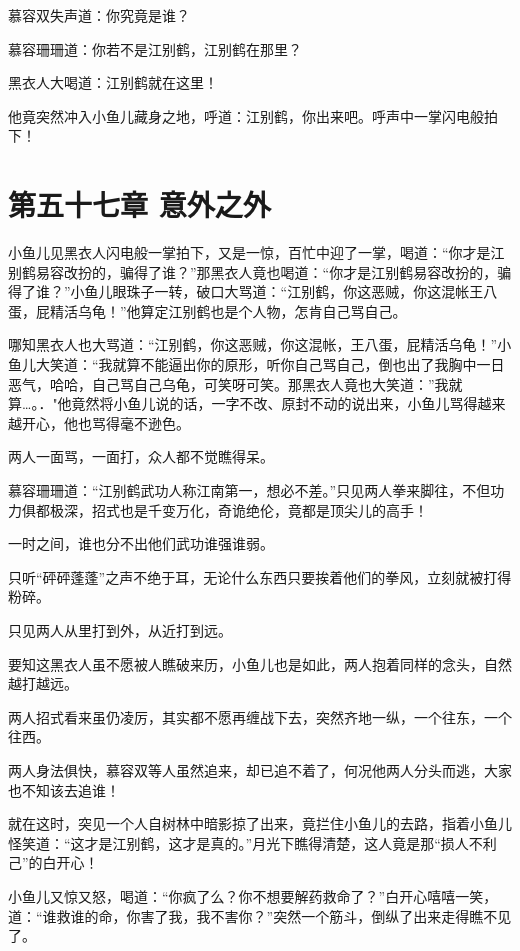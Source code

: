 \documentclass[12pt,oneside]{book}
\begin{document}
慕容双失声道：你究竟是谁？

慕容珊珊道：你若不是江别鹤，江别鹤在那里？

黑衣人大喝道：江别鹤就在这里！

他竟突然冲入小鱼儿藏身之地，呼道：江别鹤，你出来吧。呼声中一掌闪电般拍下！

\hypertarget{ux7b2cux4e94ux5341ux4e03ux7ae0-ux610fux5916ux4e4bux5916}{%
\chapter{第五十七章
意外之外}\label{ux7b2cux4e94ux5341ux4e03ux7ae0-ux610fux5916ux4e4bux5916}}

小鱼儿见黑衣人闪电般一掌拍下，又是一惊，百忙中迎了一掌，喝道：``你才是江别鹤易容改扮的，骗得了谁？''那黑衣人竟也喝道：``你才是江别鹤易容改扮的，骗得了谁？''小鱼儿眼珠子一转，破口大骂道：``江别鹤，你这恶贼，你这混帐王八蛋，屁精活乌龟！''他算定江别鹤也是个人物，怎肯自己骂自己。

哪知黑衣人也大骂道：``江别鹤，你这恶贼，你这混帐，王八蛋，屁精活乌龟！''小鱼儿大笑道：``我就算不能逼出你的原形，听你自己骂自己，倒也出了我胸中一日恶气，哈哈，自己骂自己乌龟，可笑呀可笑。那黑衣人竟也大笑道：''我就算\ldots。．"他竟然将小鱼儿说的话，一字不改、原封不动的说出来，小鱼儿骂得越来越开心，他也骂得毫不逊色。

两人一面骂，一面打，众人都不觉瞧得呆。

慕容珊珊道：``江别鹤武功人称江南第一，想必不差。''只见两人拳来脚往，不但功力俱都极深，招式也是千变万化，奇诡绝伦，竟都是顶尖儿的高手！

一时之间，谁也分不出他们武功谁强谁弱。

只听``砰砰蓬蓬''之声不绝于耳，无论什么东西只要挨着他们的拳风，立刻就被打得粉碎。

只见两人从里打到外，从近打到远。

要知这黑衣人虽不愿被人瞧破来历，小鱼儿也是如此，两人抱着同样的念头，自然越打越远。

两人招式看来虽仍凌厉，其实都不愿再缠战下去，突然齐地一纵，一个往东，一个往西。

两人身法俱快，慕容双等人虽然追来，却已追不着了，何况他两人分头而逃，大家也不知该去追谁！

就在这时，突见一个人自树林中暗影掠了出来，竟拦住小鱼儿的去路，指着小鱼儿怪笑道：``这才是江别鹤，这才是真的。''月光下瞧得清楚，这人竟是那``损人不利己''的白开心！

小鱼儿又惊又怒，喝道：``你疯了么？你不想要解药救命了？''白开心嘻嘻一笑，道：``谁救谁的命，你害了我，我不害你？''突然一个筋斗，倒纵了出来走得瞧不见了。
\end{document}
